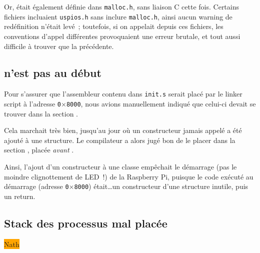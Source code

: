 \documentclass[11pt,a4paper]{article}
\newcommand{\hex}[1]{\texttt{0$\times$#1}}
\newcommand{\fname}[1]{\texttt{#1}} %
\newcommand{\todo}[1]{\colorbox{orange}{\color{blue}{\Large TODO:} #1}}
\begin{document}
Or,  était également définie dans \fname{malloc.h}, sans liaison
C cette fois. Certains fichiers incluaient \fname{uspios.h} sans inclure
\fname{malloc.h}, ainsi aucun warning de redéfinition n'était levé~; toutefois,
si on appelait  depuis ces fichiers, les conventions d'appel
différentes provoquaient une erreur brutale, et tout aussi difficile à
trouver que la précédente.

\subsection*{ n'est pas au début}
Pour s'assurer que l'assembleur contenu dans \fname{init.s} serait placé par
le linker script à l'adresse \hex{8000}, nous avions manuellement indiqué
que celui-ci devait se trouver dans la section .

Cela marchait très bien, jusqu'au jour où un constructeur jamais appelé a été
ajouté à une structure. Le compilateur a alors jugé bon de le placer dans
la section , placée \emph{avant} .

Ainsi, l'ajout d'un constructeur à une classe empêchait le démarrage
(pas le moindre clignottement de LED~!) de la Raspberry Pi, puisque le code
exécuté au démarrage (adresse \hex{8000}) était\ldots un constructeur d'une
structure inutile, puis un return.

\subsection*{Stack des processus mal placée}
\todo{Nath}
\end{document}
